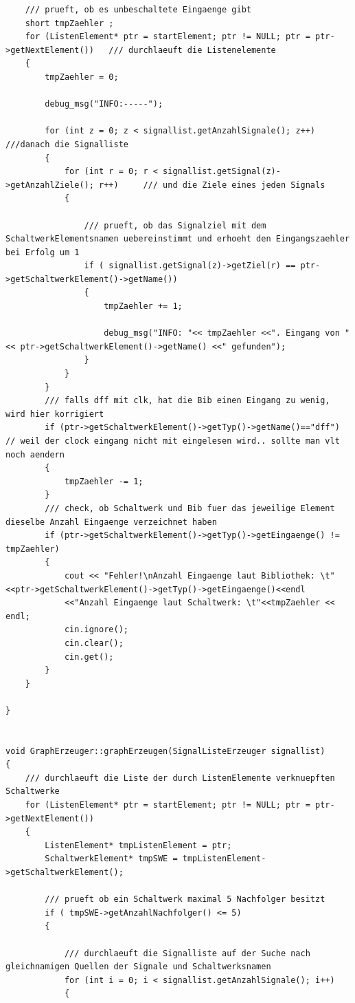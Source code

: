 \documentclass[a4paper,10pt,twoside]{report}
\begin{document}
\begin{lstlisting}
    /// prueft, ob es unbeschaltete Eingaenge gibt
    short tmpZaehler ;
    for (ListenElement* ptr = startElement; ptr != NULL; ptr = ptr->getNextElement())   /// durchlaeuft die Listenelemente
    {
        tmpZaehler = 0;

        debug_msg("INFO:-----");

        for (int z = 0; z < signallist.getAnzahlSignale(); z++)         ///danach die Signalliste
        {
            for (int r = 0; r < signallist.getSignal(z)->getAnzahlZiele(); r++)     /// und die Ziele eines jeden Signals
            {

                /// prueft, ob das Signalziel mit dem SchaltwerkElementsnamen uebereinstimmt und erhoeht den Eingangszaehler bei Erfolg um 1
                if ( signallist.getSignal(z)->getZiel(r) == ptr->getSchaltwerkElement()->getName())
                {
                    tmpZaehler += 1;

                    debug_msg("INFO: "<< tmpZaehler <<". Eingang von "<< ptr->getSchaltwerkElement()->getName() <<" gefunden");
                }
            }
        }
        /// falls dff mit clk, hat die Bib einen Eingang zu wenig, wird hier korrigiert
        if (ptr->getSchaltwerkElement()->getTyp()->getName()=="dff")  // weil der clock eingang nicht mit eingelesen wird.. sollte man vlt noch aendern
        {
            tmpZaehler -= 1;
        }
        /// check, ob Schaltwerk und Bib fuer das jeweilige Element dieselbe Anzahl Eingaenge verzeichnet haben
        if (ptr->getSchaltwerkElement()->getTyp()->getEingaenge() != tmpZaehler)
        {
            cout << "Fehler!\nAnzahl Eingaenge laut Bibliothek: \t"<<ptr->getSchaltwerkElement()->getTyp()->getEingaenge()<<endl
            <<"Anzahl Eingaenge laut Schaltwerk: \t"<<tmpZaehler << endl;
            cin.ignore();
            cin.clear();
            cin.get();
        }
    }

}


void GraphErzeuger::graphErzeugen(SignalListeErzeuger signallist)
{
    /// durchlaeuft die Liste der durch ListenElemente verknuepften Schaltwerke
    for (ListenElement* ptr = startElement; ptr != NULL; ptr = ptr->getNextElement())
    {
        ListenElement* tmpListenElement = ptr;
        SchaltwerkElement* tmpSWE = tmpListenElement->getSchaltwerkElement();

        /// prueft ob ein Schaltwerk maximal 5 Nachfolger besitzt
        if ( tmpSWE->getAnzahlNachfolger() <= 5)
        {

            /// durchlaeuft die Signalliste auf der Suche nach gleichnamigen Quellen der Signale und Schaltwerksnamen
            for (int i = 0; i < signallist.getAnzahlSignale(); i++)
            {


\end{lstlisting}
\end{document}
